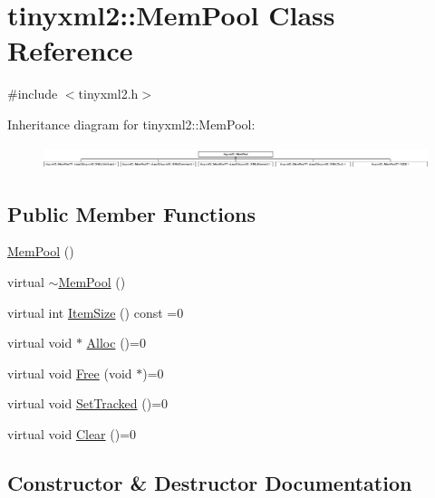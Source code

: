 \hypertarget{classtinyxml2_1_1_mem_pool}{}\section{tinyxml2\+:\+:Mem\+Pool Class Reference}
\label{classtinyxml2_1_1_mem_pool}


{\ttfamily \#include $<$tinyxml2.\+h$>$}

Inheritance diagram for tinyxml2\+:\+:Mem\+Pool\+:\begin{figure}[H]
\begin{center}
\leavevmode
\includegraphics[height=0.691358cm]{classtinyxml2_1_1_mem_pool}
\end{center}
\end{figure}
\subsection*{Public Member Functions}
\begin{DoxyCompactItemize}
\item 
\hyperlink{classtinyxml2_1_1_mem_pool_a9101a0083d7370c85bd5aaaba7157f84}{Mem\+Pool} ()
\item 
virtual \hyperlink{classtinyxml2_1_1_mem_pool_ae55ad9e3faeca702e6ccbb38fdbcad72}{$\sim$\+Mem\+Pool} ()
\item 
virtual int \hyperlink{classtinyxml2_1_1_mem_pool_a0c518d49e3a94bde566f61e13b7240bb}{Item\+Size} () const =0
\item 
virtual void $\ast$ \hyperlink{classtinyxml2_1_1_mem_pool_a4f977b5fed752c0bbfe5295f469d6449}{Alloc} ()=0
\item 
virtual void \hyperlink{classtinyxml2_1_1_mem_pool_a49e3bfac2cba2ebd6776b31e571f64f7}{Free} (void $\ast$)=0
\item 
virtual void \hyperlink{classtinyxml2_1_1_mem_pool_ac5804dd1387b2e4de5eef710076a0db1}{Set\+Tracked} ()=0
\item 
virtual void \hyperlink{classtinyxml2_1_1_mem_pool_a74fcdef9756917c8ae19fbbb4d658ed7}{Clear} ()=0
\end{DoxyCompactItemize}


\subsection{Constructor \& Destructor Documentation}
\hypertarget{classtinyxml2_1_1_mem_pool_a9101a0083d7370c85bd5aaaba7157f84}{}
